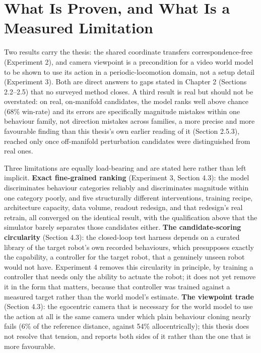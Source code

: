 \documentclass[12pt,a4paper,oneside]{report}
\begin{document}
\section{What Is Proven, and What Is a Measured Limitation}
Two results carry the thesis: the shared coordinate transfers correspondence-free (Experiment 2), and camera
viewpoint is a precondition for a video world model to be shown to use its action in a periodic-locomotion domain,
not a setup detail (Experiment 3). Both are direct answers to gaps stated in Chapter 2 (Sections 2.2--2.5) that no
surveyed method closes. A third result is real but should not be overstated: on real, on-manifold candidates, the
model ranks well above chance (68\% win-rate) and its errors are specifically magnitude mistakes within one
behaviour family, not direction mistakes across families, a more precise and more favourable finding than this
thesis's own earlier reading of it (Section 2.5.3), reached only once off-manifold perturbation candidates were
distinguished from real ones.

Three limitations are equally load-bearing and are stated here rather than left implicit. \textbf{Exact
fine-grained ranking} (Experiment 3, Section 4.3): the model discriminates behaviour categories reliably and
discriminates magnitude within one category poorly, and five structurally different interventions, training
recipe, architecture capacity, data volume, readout redesign, and that redesign's real retrain, all converged
on the identical result, with the qualification above that the simulator barely separates those candidates either.
\textbf{The candidate-scoring circularity} (Section 4.3): the closed-loop test harness depends on a curated library
of the target robot's own recorded behaviours, which presupposes exactly the capability, a controller for the target
robot, that a genuinely unseen robot would not have. Experiment 4 removes this circularity in principle, by
training a controller that needs only the ability to actuate the robot; it does not yet remove it in the form that
matters, because that controller was trained against a measured target rather than the world model's estimate.
\textbf{The viewpoint trade} (Section 4.3): the egocentric camera that is necessary for the world model to use the
action at all is the same camera under which plain behaviour cloning nearly fails (6\% of the reference distance,
against 54\% allocentrically); this thesis does not resolve that tension, and reports both sides of it rather than
the one that is more favourable.
\end{document}
